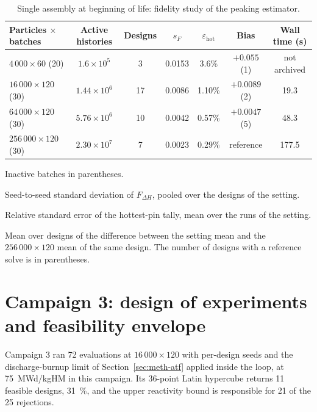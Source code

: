 \begin{table}[htbp]
  \centering
  \begin{threeparttable}
  \caption{Single assembly at beginning of life: fidelity study of the peaking estimator.}
  \label{tab:fid-ladder}
  \small
  \setlength{\tabcolsep}{4pt}
  \begin{tabular}{@{}lcccccc@{}}
    \toprule
    Particles $\times$ batches & Active histories & Designs & $s_F$\tnote{a} & $\varepsilon_\mathrm{hot}$\tnote{b} & Bias\tnote{c} & Wall time (s) \\
    \midrule
    $4\,000\times60$ (20)    & $1.6\times10^{5}$  & 3  & 0.0153 & 3.6\%  & $+0.055$ (1)  & not archived \\
    $16\,000\times120$ (30)  & $1.44\times10^{6}$ & 17 & 0.0086 & 1.10\% & $+0.0089$ (2) & 19.3 \\
    $64\,000\times120$ (30)  & $5.76\times10^{6}$ & 10 & 0.0042 & 0.57\% & $+0.0047$ (5) & 48.3 \\
    $256\,000\times120$ (30) & $2.30\times10^{7}$ & 7  & 0.0023 & 0.29\% & reference     & 177.5 \\
    \bottomrule
  \end{tabular}
  \begin{tablenotes}[flushleft]\footnotesize
    \item Inactive batches in parentheses.
    \item[a] Seed-to-seed standard deviation of $F_{\Delta H}$, pooled
      over the designs of the setting.
    \item[b] Relative standard error of the hottest-pin tally, mean over
      the runs of the setting.
    \item[c] Mean over designs of the difference between the setting mean
      and the $256\,000\times120$ mean of the same design. The number of
      designs with a reference solve is in parentheses.
  \end{tablenotes}
  \end{threeparttable}
\end{table}


\section{Campaign 3: design of experiments and feasibility envelope}
\label{sec:res-c3doe}

Campaign 3 ran 72 evaluations at $16\,000\times120$ with per-design
seeds and the discharge-burnup limit of Section~\ref{sec:meth-atf}
applied inside the loop, at \SI{75}{MWd/kgHM} in this campaign. Its
36-point Latin hypercube returns 11 feasible designs, \SI{31}{\%}, and
the upper reactivity bound is responsible for 21 of the 25 rejections.

